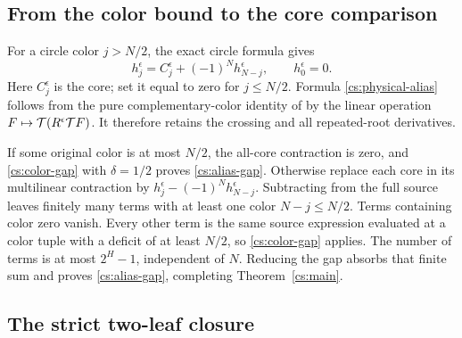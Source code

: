 \subsection{From the color bound to the core comparison}

For a circle color \(j>N/2\), the exact circle formula gives
\begin{equation}\label{cs:physical-alias}
 h_j^\epsilon=C_j^\epsilon+(-1)^N h_{N-j}^\epsilon,
       \qquad h_0^\epsilon=0.
\end{equation}
Here \(C_j^\epsilon\) is the core; set it equal to zero
for \(j\le N/2\). Formula \eqref{cs:physical-alias} follows from
the pure complementary-color identity of \cite[Section 4]{Newton}
by the linear operation \(F\mapsto\mathcal T(R^\epsilon\mathcal T F)\).
It therefore retains the crossing and all repeated-root derivatives.

If some original color is at most \(N/2\), the all-core contraction
is zero, and \eqref{cs:color-gap} with \(\delta=1/2\) proves
\eqref{cs:alias-gap}. Otherwise replace each core in its
multilinear contraction by
\(h_j^\epsilon-(-1)^N h_{N-j}^\epsilon\).
Subtracting from the full source leaves finitely many terms with
at least one color \(N-j\le N/2\). Terms containing color zero
vanish. Every other term is the same source expression evaluated at a color tuple with a deficit of at least $N/2$, so \eqref{cs:color-gap} applies. The number
of terms is at most \(2^H-1\), independent of \(N\). Reducing
the gap absorbs that finite sum and proves
\eqref{cs:alias-gap}, completing Theorem~\ref{cs:main}.

\subsection{The strict two-leaf closure}

